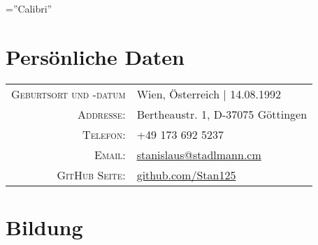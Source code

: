 \documentclass[a4paper,10pt]{article} %
\begin{document}
\pagestyle{empty} %

\font\fb=''Calibri'' %


\par{\bigskip\par} %

\section{Persönliche Daten}

\begin{tabular}{rl}
\textsc{Geburtsort und -datum} & Wien, Österreich  | 14.08.1992 \\
\textsc{Addresse:} & Bertheaustr. 1, D-37075 Göttingen \\
\textsc{Telefon:} & +49 173 692 5237\\
\textsc{Email:} & \href{mailto:stanislaus@stadlmann.cm}{stanislaus@stadlmann.cm} \\
\textsc{GitHub Seite:} & \href{https://github.com/Stan125}{github.com/Stan125}
\end{tabular}


\section{Bildung}

\end{document}
